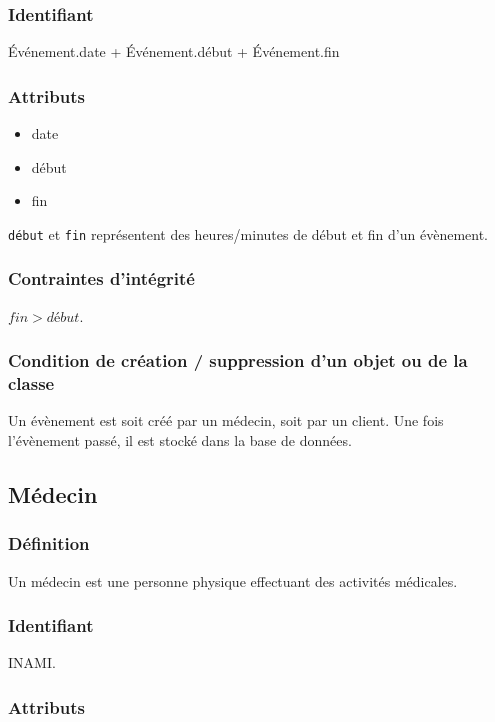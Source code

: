 \documentclass[a4paper, 11pt]{report}
\begin{document}
\subsubsection{Identifiant}

Événement.date + Événement.début + Événement.fin

\subsubsection{Attributs}

\begin{itemize}
    \item date
    \item début
    \item fin
\end{itemize}

\texttt{début} et \texttt{fin} représentent des heures/minutes de début et fin d'un évènement.

\subsubsection{Contraintes d'intégrité}

$fin > début$.

\subsubsection{Condition de création / suppression d'un objet ou de la classe}

Un évènement est soit créé par un médecin, soit par un client. Une fois l'évènement passé,
il est stocké dans la base de données.

\subsection{Médecin}

\subsubsection{Définition}

Un médecin est une personne physique effectuant des activités médicales.

\subsubsection{Identifiant}

INAMI.

\subsubsection{Attributs}
\end{document}
